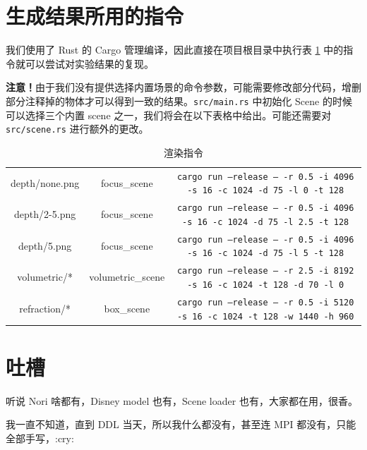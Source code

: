 \documentclass{ctexart}
\begin{document}
\appendix

\section{生成结果所用的指令}
\label{sec:cmd}
我们使用了 Rust 的 Cargo 管理编译，因此直接在项目根目录中执行表 \ref{tbl:cmd} 中的指令就可以尝试对实验结果的复现。

\textbf{注意！}由于我们没有提供选择内置场景的命令参数，可能需要修改部分代码，增删部分注释掉的物体才可以得到一致的结果。\texttt{src/main.rs} 中初始化 Scene 的时候可以选择三个内置 scene 之一，我们将会在以下表格中给出。可能还需要对 \texttt{src/scene.rs} 进行额外的更改。

\begin{table}
  \scriptsize
\centering
\begin{tabular}{|c|c|c|}
  \hline
  depth/none.png & focus\_scene & \texttt{cargo run --release  -- -r 0.5 -i 4096 -s 16 -c 1024 -d 75 -l 0 -t 128} \\
  depth/2-5.png & focus\_scene & \texttt{cargo run --release  -- -r 0.5 -i 4096 -s 16 -c 1024 -d 75 -l 2.5 -t 128} \\
  depth/5.png & focus\_scene & \texttt{cargo run --release  -- -r 0.5 -i 4096 -s 16 -c 1024 -d 75 -l 5 -t 128} \\
  \hline
  volumetric/* & volumetric\_scene & \texttt{cargo run --release  -- -r 2.5 -i 8192 -s 16 -c 1024 -t 128 -d 70 -l 0} \\
  \hline
  refraction/* & box\_scene & \texttt{cargo run --release  -- -r 0.5 -i 5120 -s 16 -c 1024 -t 128 -w 1440 -h 960} \\
  \hline
\end{tabular}
\caption{渲染指令}
\label{tbl:cmd}
\end{table}

\section{吐槽}
听说 Nori 啥都有，Disney model 也有，Scene loader 也有，大家都在用，很香。

我一直不知道，直到 DDL 当天，所以我什么都没有，甚至连 MPI 都没有，只能全部手写，:cry:



\end{document}
